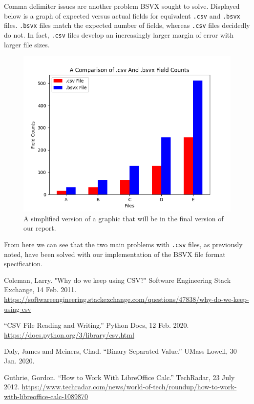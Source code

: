 \documentclass[10pt]{article}
\begin{document}
\indent{}
Comma delimiter issues are another problem BSVX sought to solve.
Displayed below is a graph of expected versus actual fields for equivalent \texttt{.csv} and \texttt{.bsvx} files.
\texttt{.bsvx} files match the expected number of fields, whereas \texttt{.csv} files decidedly do not.
In fact, \texttt{.csv} files develop an increasingly larger margin of error with larger file sizes.

\begin{figure}[H]
\centering
\includegraphics[width=5in]{scripts/figures/2.png}
\caption{A simplified version of a graphic that will be in the final version of our report.}
\label{fig:results_2}
\end{figure}

\indent{}
From here we can see that the two main problems with \texttt{.csv} files, as previously noted, have been solved with our implementation of the BSVX file format specification.

\clearpage
{}
\printnoidxglossary[nonumberlist]

\clearpage
\begin{thebibliography}{9}

    Coleman, Larry.
    "Why do we keep using CSV?"
    Software Engineering Stack Exchange,
    14 Feb. 2011.
    \url{https://softwareengineering.stackexchange.com/questions/47838/why-do-we-keep-using-csv}

    “CSV File Reading and Writing.”
    Python Docs,
    12 Feb. 2020.
    \url{https://docs.python.org/3/library/csv.html}

    Daly, James and Meiners, Chad.
    “Binary Separated Value.”
    UMass Lowell,
    30 Jan. 2020.

    Guthrie, Gordon.
    “How to Work With LibreOffice Calc.”
    TechRadar,
    23 July 2012.
    \url{https://www.techradar.com/news/world-of-tech/roundup/how-to-work-with-libreoffice-calc-1089870}
  
\end{thebibliography}
\end{document}
